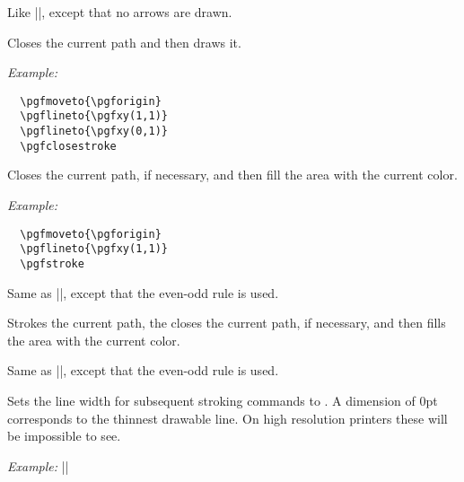 \documentclass{ltxdoc}
\def\example{\par\smallskip\noindent\textit{Example: }}
\begin{document}
\begin{command}{\pgfqstroke}
  Like |\pgfstroke|, except that no arrows are drawn.
\end{command}


\begin{command}{\pgfclosestroke}
  Closes the current path and then draws it.
  \example
\begin{verbatim}
  \pgfmoveto{\pgforigin}
  \pgflineto{\pgfxy(1,1)}
  \pgflineto{\pgfxy(0,1)}
  \pgfclosestroke
\end{verbatim}
\end{command}

\begin{command}{\pgffill}
  Closes the current path, if necessary, and then fill the area with
  the current color.
  \example
\begin{verbatim}
  \pgfmoveto{\pgforigin}
  \pgflineto{\pgfxy(1,1)}
  \pgfstroke
\end{verbatim}
\end{command}

\begin{command}{\pgfeofill}
  Same as |\pgffill|, except that the even-odd rule is used.
\end{command}

\begin{command}{\pgffillstroke}
  Strokes the current path, the closes the current path, if necessary,
  and then fills the area with the current color.
\end{command}

\begin{command}{\pgfeofillstroke}
  Same as |\pgffillstroke|, except that the even-odd rule is used.
\end{command}


\begin{command}{\pgfsetlinewidth{}}
  Sets the line width for subsequent stroking commands to . A dimension of 0pt corresponds to the thinnest drawable 
  line. On high resolution printers these will be impossible to see.
  \example |\pgfsetlinewidth{3pt}|
\end{command}
\end{document}
